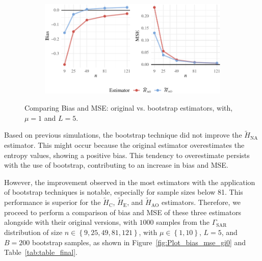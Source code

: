 \begin{figure}[H]
\begin{subfigure}[t]{0.48\textwidth}
    \caption{}
    \label{fig:subfig5}
  \end{subfigure}
  \hfill
  \begin{subfigure}[t]{0.48\textwidth}
    \centering
    \includegraphics[width=\textwidth]{../../Figures/PDF/Plot_bias_mse_AO-1}
    \caption{}
    \label{fig:subfig6}
  \end{subfigure}
  \caption{Comparing Bias and MSE: original vs. bootstrap estimators, with, $\mu=1$ and $L=5$.}
  \label{fig:all_estimator}
\end{figure}

Based on previous simulations, the bootstrap technique did not improve the \(\widetilde{H}_{\text{NA}}\) estimator. 
This might occur because the original estimator overestimates the entropy values, showing a positive bias. 
This tendency to overestimate persists with the use of bootstrap, contributing to an increase in bias and MSE.

However, the improvement observed in the most estimators with the application of bootstrap techniques is notable, especially for sample sizes below 81. 
This performance is superior for the \(\widetilde{H}_{\text{C}}\), \(\widetilde{H}_{\text{E}}\), and \(\widetilde{H}_{\text{AO}}\) estimators. 
Therefore, we proceed to perform a comparison of bias and MSE of these three estimators alongside with their original versions, with \(1000\) samples from the \(\Gamma_{\text{SAR}}\) distribution of
size \(n\in\left\{9, 25, 49, 81, 121\right\}\), with \(\mu\in\left\{1, 10\right\}\), \(L=5\), and \(B=200\) bootstrap samples, as shown in Figure~\ref{fig:Plot_bias_mse_gi0} and Table~\ref{tab:table_final}.

